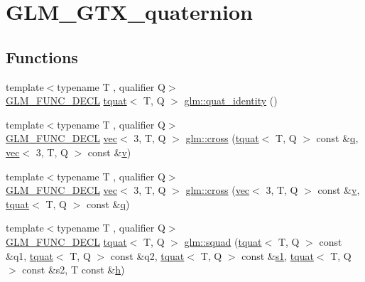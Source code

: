 \hypertarget{group__gtx__quaternion}{}\section{G\+L\+M\+\_\+\+G\+T\+X\+\_\+quaternion}
\label{group__gtx__quaternion}
\subsection*{Functions}
\begin{DoxyCompactItemize}
\item 
{\footnotesize template$<$typename T , qualifier Q$>$ }\\\mbox{\hyperlink{setup_8hpp_ab2d052de21a70539923e9bcbf6e83a51}{G\+L\+M\+\_\+\+F\+U\+N\+C\+\_\+\+D\+E\+CL}} \mbox{\hyperlink{structglm_1_1tquat}{tquat}}$<$ T, Q $>$ \mbox{\hyperlink{group__gtx__quaternion_ga40788ce1d74fac29fa000af893a3ceb5}{glm\+::quat\+\_\+identity}} ()
\item 
{\footnotesize template$<$typename T , qualifier Q$>$ }\\\mbox{\hyperlink{setup_8hpp_ab2d052de21a70539923e9bcbf6e83a51}{G\+L\+M\+\_\+\+F\+U\+N\+C\+\_\+\+D\+E\+CL}} \mbox{\hyperlink{structglm_1_1vec}{vec}}$<$ 3, T, Q $>$ \mbox{\hyperlink{group__gtx__quaternion_ga8639615408166d0dddda1b91a940b338}{glm\+::cross}} (\mbox{\hyperlink{structglm_1_1tquat}{tquat}}$<$ T, Q $>$ const \&\mbox{\hyperlink{_s_d_l__opengl_8h_a8fc1e7b9baaae687804c7eed46ca09c6}{q}}, \mbox{\hyperlink{structglm_1_1vec}{vec}}$<$ 3, T, Q $>$ const \&\mbox{\hyperlink{_s_d_l__opengl_8h_a10a82eabcb59d2fcd74acee063775f90}{v}})
\item 
{\footnotesize template$<$typename T , qualifier Q$>$ }\\\mbox{\hyperlink{setup_8hpp_ab2d052de21a70539923e9bcbf6e83a51}{G\+L\+M\+\_\+\+F\+U\+N\+C\+\_\+\+D\+E\+CL}} \mbox{\hyperlink{structglm_1_1vec}{vec}}$<$ 3, T, Q $>$ \mbox{\hyperlink{group__gtx__quaternion_gaa75ca5654e0dc3b61c05db091f7d46ce}{glm\+::cross}} (\mbox{\hyperlink{structglm_1_1vec}{vec}}$<$ 3, T, Q $>$ const \&\mbox{\hyperlink{_s_d_l__opengl_8h_a10a82eabcb59d2fcd74acee063775f90}{v}}, \mbox{\hyperlink{structglm_1_1tquat}{tquat}}$<$ T, Q $>$ const \&\mbox{\hyperlink{_s_d_l__opengl_8h_a8fc1e7b9baaae687804c7eed46ca09c6}{q}})
\item 
{\footnotesize template$<$typename T , qualifier Q$>$ }\\\mbox{\hyperlink{setup_8hpp_ab2d052de21a70539923e9bcbf6e83a51}{G\+L\+M\+\_\+\+F\+U\+N\+C\+\_\+\+D\+E\+CL}} \mbox{\hyperlink{structglm_1_1tquat}{tquat}}$<$ T, Q $>$ \mbox{\hyperlink{group__gtx__quaternion_gacfcb16619e166e672c4672aff50a565c}{glm\+::squad}} (\mbox{\hyperlink{structglm_1_1tquat}{tquat}}$<$ T, Q $>$ const \&q1, \mbox{\hyperlink{structglm_1_1tquat}{tquat}}$<$ T, Q $>$ const \&q2, \mbox{\hyperlink{structglm_1_1tquat}{tquat}}$<$ T, Q $>$ const \&\mbox{\hyperlink{_s_d_l__opengl__glext_8h_a4ed25fb4dc5bf1a768a78d2e2f0ca003}{s1}}, \mbox{\hyperlink{structglm_1_1tquat}{tquat}}$<$ T, Q $>$ const \&s2, T const \&\mbox{\hyperlink{_s_d_l__opengl__glext_8h_afa0fb1b5e976920c0abeff2dca3ed774}{h}})

\end{DoxyCompactItemize}
